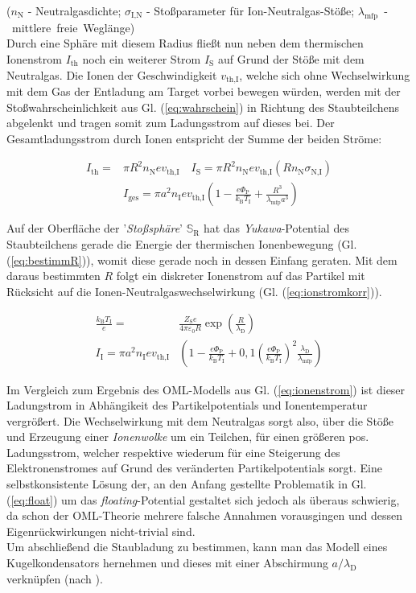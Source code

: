 \documentclass[numbers=noenddot,a4paper]{scrartcl}
\newcommand{\ix}[1]{_\text{#1}}
\newcommand{\tilt}[1]{\textit{#1}}
\begin{document}
			($n\ix{N}$ - Neutralgasdichte; $\sigma\ix{I,N}$ - Stoßparameter für Ion-Neutralgas-Stöße; \mbox{$\lambda\ix{mfp}$ - mittlere freie Wegl\"ange})\\
			Durch eine Sph\"are mit diesem Radius flie{\ss}t nun neben dem thermischen Ionenstrom $I\ix{th}$ noch ein weiterer Strom $I\ix{S}$ auf Grund der St\"o{\ss}e mit dem Neutralgas. Die Ionen der Geschwindigkeit $v\ix{th,I}$, welche sich ohne Wechselwirkung mit dem Gas der Entladung am Target vorbei bewegen w\"urden, werden mit der Sto{\ss}wahrscheinlichkeit aus Gl. (\ref{eq:wahrschein}) in Richtung des Staubteilchens abgelenkt und tragen somit zum Ladungsstrom auf dieses bei. Der Gesamtladungsstrom durch Ionen entspricht der Summe der beiden Str\"ome:

				\begin{align}
					I\ix{th}=&\pi R^{2}n\ix{N}ev\ix{th,I} \quad I\ix{S}=\pi R^2n\ix{N}ev\ix{th,I}\left(Rn\ix{N}\sigma\ix{N,I}\right) \\
					&I\ix{ges}=\pi a^{2}n\ix{I}ev\ix{th,I}\left(1-\frac{e\Phi\ix{P}}{k\ix{B}T\ix{I}}+\frac{R^{3}}{\lambda\ix{mfp}a^{3}}\right)
				\end{align}

			Auf der Oberfl\"ache der '\tilt{Sto{\ss}sph\"are}' $\mathbb{S}\ix{R}$ hat das \tilt{Yukawa}-Potential des Staubteilchens gerade die Energie der thermischen Ionenbewegung (Gl. (\ref{eq:bestimmR})), womit diese gerade noch in dessen Einfang geraten. Mit dem daraus bestimmten $R$ folgt ein diskreter Ionenstrom auf das Partikel mit R\"ucksicht auf die Ionen-Neutralgaswechselwirkung (Gl. (\ref{eq:ionstromkorr})).

				\begin{align}
					\frac{k\ix{B}T\ix{I}}{e}=&\frac{Z\ix{S}e}{4\pi\varepsilon\ix{0}R}\exp\left(\frac{R}{\lambda\ix{D}}\right) \label{eq:bestimmR} \\
					I\ix{I}=\pi a^{2} n\ix{I}e v\ix{th,I}&\left(1-\frac{e\Phi\ix{P}}{k\ix{B}T\ix{I}}+0,1\left(\frac{e\Phi\ix{P}}{k\ix{B}T\ix{I}}\right)^{2}\frac{\lambda\ix{D}}{\lambda\ix{mfp}}\right) \label{eq:ionstromkorr}
				\end{align}

			Im Vergleich zum Ergebnis des OML-Modells aus Gl. (\ref{eq:ionenstrom}) ist dieser Ladungstrom in Abh\"angikeit des Partikelpotentials und Ionentemperatur vergr\"o{\ss}ert. Die Wechselwirkung mit dem Neutralgas sorgt also, \"uber die St\"o{\ss}e und Erzeugung einer \tilt{Ionenwolke} um ein Teilchen, f\"ur einen gr\"o{\ss}eren pos. Ladungsstrom, welcher respektive wiederum f\"ur eine Steigerung des Elektronenstromes auf Grund des ver\"anderten Partikelpotentials sorgt. Eine selbstkonsistente L\"osung der, an den Anfang gestellte Problematik in Gl. (\ref{eq:float}) um das \tilt{floating}-Potential gestaltet sich jedoch als \"uberaus schwierig, da schon der OML-Theorie mehrere falsche Annahmen vorausgingen und dessen Eigenr\"uckwirkungen nicht-trivial sind.\\
			Um abschließend die Staubladung zu bestimmen, kann man das Modell eines Kugelkondensators hernehmen und dieses mit einer Abschirmung $a/\lambda\ix{D}$ verknüpfen (nach \cite{Melzer12}).
\end{document}
